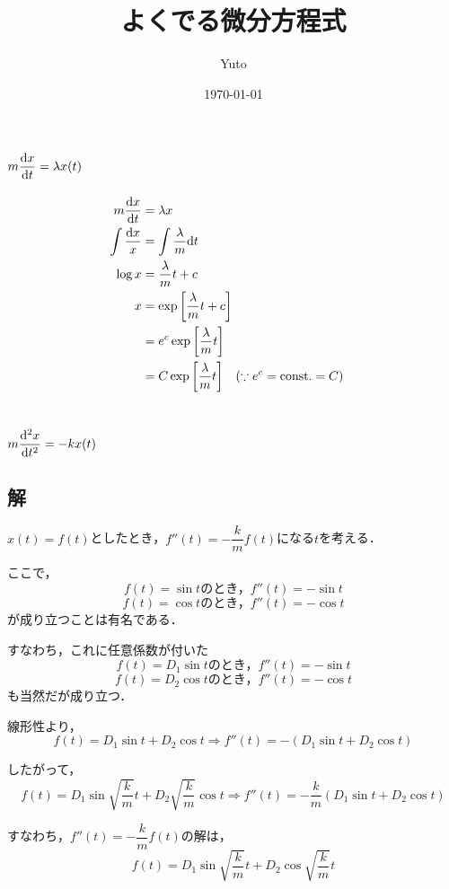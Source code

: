 \documentclass[uplatex]{jsarticle}
\title{ よくでる微分方程式 }
\date{\today}
\author{ Yuto }
\makeatletter
\def\mojiparline#1{
	\newcounter{mpl}
	\setcounter{mpl}{#1}
	\@tempdima=\linewidth
	\advance\@tempdima by-\value{mpl}zw
	\addtocounter{mpl}{-1}
	\divide\@tempdima by \value{mpl}
	\advance\kanjiskip by\@tempdima
	\advance\parindent by\@tempdima
}
\def\linesparpage#1{
	\baselineskip=\textheight
	\divide\baselineskip by #1
}
\makeatother
\begin{document}
\maketitle

\renewcommand{\thesection}{その\arabic{section}.}
\section{$\displaystyle m\dv{x}{t} = \lambda x(t)$}

\begin{align*}
	m\dv{x}{t} &= \lambda x \\
	\int\dfrac{\mathrm{d}x}{x} &= \int \dfrac{\lambda }{m} \mathrm{d}t \\
	\log x &= \dfrac{\lambda }{m}t + c \\
	x &= \exp\qty[\dfrac{\lambda }{m}t + c] \\
	&= e^c\exp\qty[\dfrac{\lambda }{m}t] \\
	&= C\exp\qty[\dfrac{\lambda }{m}t] \qq{($\because e^c = \mathrm{const}. = C$)}
\end{align*}

\section{$\displaystyle m\dv[2]{x}{t} = -kx(t)$}
\subsection{解}

$x(t) = f(t)$としたとき，$f''(t) = -\dfrac{k}{m}f(t)$になる$t$を考える．

ここで，
$$f(t) = \sin t\mbox{のとき，}f''(t) = -\sin t$$
$$f(t) = \cos t\mbox{のとき，}f''(t) = -\cos t$$
が成り立つことは有名である．

すなわち，これに任意係数が付いた
$$f(t) = D_1\sin t\mbox{のとき，}f''(t) = -\sin t$$
$$f(t) = D_2\cos t\mbox{のとき，}f''(t) = -\cos t$$
も当然だが成り立つ．

線形性より，
\[
	f(t) = D_1\sin t + D_2\cos t
	\Rightarrow
	f''(t) = -(D_1\sin t + D_2\cos t)
\]

したがって，
\[
	f(t) = D_1\sin \sqrt{\dfrac{k}{m}}t + D_2\sqrt{\dfrac{k}{m}}\cos t
	\Rightarrow
	f''(t) = -\dfrac{k}{m}(D_1\sin t + D_2\cos t)
\]

すなわち，$f''(t) = -\dfrac{k}{m}f(t)$の解は，$$f(t) = D_1\sin \sqrt{\dfrac{k}{m}}t + D_2\cos\sqrt{\dfrac{k}{m}} t$$
\end{document}
